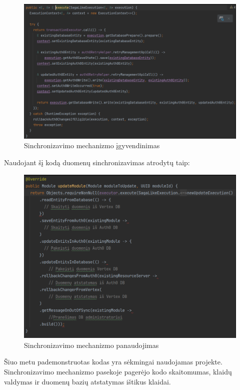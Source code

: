 \documentclass{VUMIFPSkursinis}
\begin{document}
			\begin{figure}[H]
			\includegraphics[scale=0.5]{img/six}
			\caption{Sinchronizavimo mechanizmo įgyvendinimas} %
			\label{img:kurimoProcesas}
			\end{figure}

		Naudojant šį kodą duomenų sinchronizavimas atrodytų taip:

			\begin{figure}[H]
			\includegraphics[scale=0.5]{img/seven}
			\caption{Sinchronizavimo mechanizmo panaudojimas} %
			\label{img:kurimoProcesas}
			\end{figure}

		Šiuo metu pademonstruotas kodas yra sėkmingai naudojamas projekte.
		Sinchronizavimo mechanizmo pasekoje pagerėjo kodo skaitomumas, klaidų valdymas ir duomenų bazių atstatymas ištikus klaidai.
		
\end{document}
